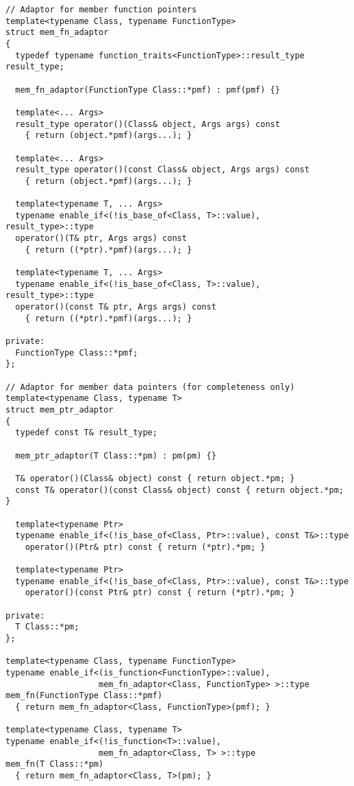\documentclass{article}
\begin{document}
\small
\begin{verbatim}
// Adaptor for member function pointers
template<typename Class, typename FunctionType>
struct mem_fn_adaptor
{
  typedef typename function_traits<FunctionType>::result_type result_type;

  mem_fn_adaptor(FunctionType Class::*pmf) : pmf(pmf) {}
  
  template<... Args>
  result_type operator()(Class& object, Args args) const
    { return (object.*pmf)(args...); }

  template<... Args>
  result_type operator()(const Class& object, Args args) const
    { return (object.*pmf)(args...); }

  template<typename T, ... Args>
  typename enable_if<(!is_base_of<Class, T>::value), result_type>::type
  operator()(T& ptr, Args args) const
    { return ((*ptr).*pmf)(args...); }

  template<typename T, ... Args>
  typename enable_if<(!is_base_of<Class, T>::value), result_type>::type
  operator()(const T& ptr, Args args) const
    { return ((*ptr).*pmf)(args...); }

private:
  FunctionType Class::*pmf;
};

// Adaptor for member data pointers (for completeness only)
template<typename Class, typename T>
struct mem_ptr_adaptor
{
  typedef const T& result_type;

  mem_ptr_adaptor(T Class::*pm) : pm(pm) {}

  T& operator()(Class& object) const { return object.*pm; }
  const T& operator()(const Class& object) const { return object.*pm; }

  template<typename Ptr> 
  typename enable_if<(!is_base_of<Class, Ptr>::value), const T&>::type
    operator()(Ptr& ptr) const { return (*ptr).*pm; }

  template<typename Ptr> 
  typename enable_if<(!is_base_of<Class, Ptr>::value), const T&>::type
    operator()(const Ptr& ptr) const { return (*ptr).*pm; }

private:
  T Class::*pm;
};

template<typename Class, typename FunctionType>
typename enable_if<(is_function<FunctionType>::value), 
                   mem_fn_adaptor<Class, FunctionType> >::type
mem_fn(FunctionType Class::*pmf)
  { return mem_fn_adaptor<Class, FunctionType>(pmf); }

template<typename Class, typename T>
typename enable_if<(!is_function<T>::value), 
                   mem_fn_adaptor<Class, T> >::type
mem_fn(T Class::*pm)
  { return mem_fn_adaptor<Class, T>(pm); }
\end{verbatim}
\normalsize 
\end{document}
